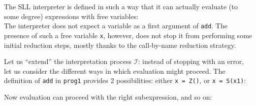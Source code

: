 
The SLL interpreter is defined in such a way that it can actually evaluate (to some degree)
expressions with free variables:\\


The interpreter does not expect a variable as a first argument of \texttt{add}. 
The presence of such a free variable \texttt{x}, however, does not stop it from
performing some initial reduction steps, mostly thanks to the call-by-name
reduction strategy.

Let us ``extend'' the interpretation process $\mathcal{I}$:
instead of stopping with an error, let us consider the different ways in which
evaluation might proceed.
The definition of \texttt{add} in \texttt{prog1} provides 2 possibilities:
either \texttt{x = Z()}, or \texttt{x = S(x1)}:



Now evaluation can proceed with the right subexpression, and so on:



